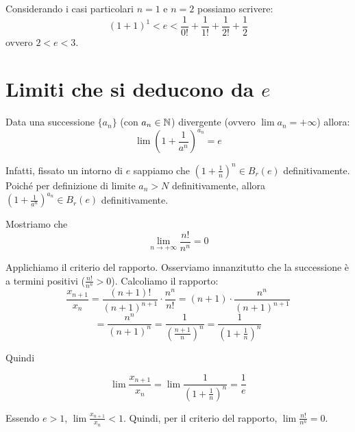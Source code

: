 Considerando i casi particolari $n = 1$ e $n = 2$ possiamo scrivere:
\begin{equation*}
(1+1)^1 < e < \frac{1}{0!} + \frac{1}{1!} + \frac{1}{2!} + \frac{1}{2}
\end{equation*}
ovvero $2 < e < 3$.

\section{Limiti che si deducono da $e$}

\begin{remark}
Data una successione $\{a_n\}$ (con $a_n \in \mathbb N$) divergente (ovvero $\lim a_n = +\infty$) allora:
\begin{equation*}
\lim \left(1 + \frac{1}{a^n}\right)^{a_n} = e
\end{equation*}

Infatti, fissato un intorno di $e$ sappiamo che $(1+\frac{1}{n})^n \in B_r(e)$ definitivamente. Poiché per definizione di limite $a_n > N$ definitivamente, allora $(1+\frac{1}{a^n})^{a_n} \in B_r(e)$ definitivamente.
\end{remark}

\begin{example}
Mostriamo che 
\begin{equation*}
\lim_{n \to +\infty} \frac{n!}{n^n} = 0
\end{equation*}

Applichiamo il criterio del rapporto. Osserviamo innanzitutto che la successione è a termini positivi ($\frac{n!}{n^n} > 0$). Calcoliamo il rapporto:
\begin{equation*}
\frac{x_{n+1}}{x_n} = \frac{(n+1)!}{(n+1)^{n+1}} \cdot \frac{n^n}{n!} = (n+1) \cdot \frac{n^n}{(n+1)^{n+1}}
\end{equation*}
\begin{equation*}
= \frac{n^n}{(n+1)^n} = \frac{1}{\left(\frac{n+1}{n}\right)^n} = \frac{1}{\left(1 + \frac{1}{n}\right)^n}
\end{equation*}

Quindi

\begin{equation*}
\lim \frac{x_{n+1}}{x_n} = \lim \frac{1}{\left(1 + \frac{1}{n} \right)^n} = \frac{1}{e}
\end{equation*}

Essendo $e > 1$, $\lim \frac{x_{n+1}}{x_n} < 1$. Quindi, per il criterio del rapporto, $\lim \frac{n!}{n^n} = 0$.
\end{example}

